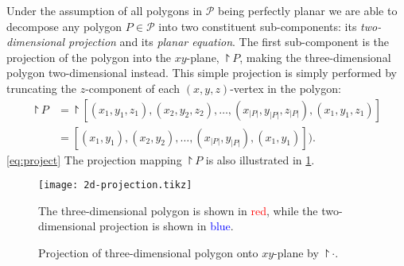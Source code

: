 Under the assumption of all polygons in $\mathcal{P}$ being perfectly planar we are able to decompose any polygon $P \in \mathcal{P}$ into two constituent sub-components: its \textit{two-dimensional projection} and its \textit{planar equation}.
The first sub-component is the projection of the polygon into the $xy$-plane, $\project{P}$, making the three-dimensional polygon two-dimensional instead.
This simple projection is simply performed by truncating the $z$-component of each $(x, y, z)$-vertex in the polygon:
\begin{align}
  \project{P}
  &=
  \project{[(x_1, y_1, z_1), (x_2, y_2, z_2), \dots, (x_{|P|}, y_{|P|}, z_{|P|}), (x_1, y_1, z_1)]}
  \nonumber\\
  &=
  [(x_1, y_1), (x_2, y_2), \dots, (x_{|P|}, y_{|P|}), (x_1, y_1)]).
  \tag{Projection mapping}\label{eq:project}
\end{align}
\cref{eq:project}
The projection mapping $\project{P}$ is also illustrated in \cref{fig:2d-polygon-projection}.
\begin{figure}
  \centering
  \texttt{[image: 2d-projection.tikz]}
  \caption{%
    Projection of three-dimensional polygon onto $xy$-plane by $\project{\cdot}$.
  }{%
    The three-dimensional polygon is shown in \textcolor{red}{red}, while the two-dimensional projection is shown in \textcolor{blue}{blue}.
  }%
  \label{fig:2d-polygon-projection}
\end{figure}

